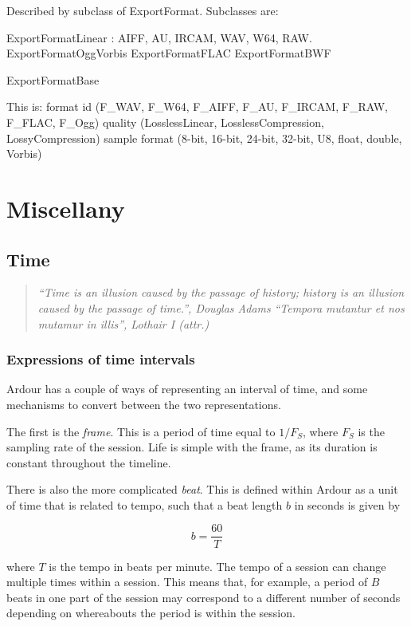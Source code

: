 \documentclass[10pt,a4paper]{book}
\begin{document}
Described by subclass of ExportFormat.  Subclasses are:

ExportFormatLinear : AIFF, AU, IRCAM, WAV, W64, RAW.
ExportFormatOggVorbis
ExportFormatFLAC
ExportFormatBWF

ExportFormatBase 

This is:
 format id (F\_WAV, F\_W64, F\_AIFF, F\_AU, F\_IRCAM, F\_RAW, F\_FLAC, F\_Ogg)
 quality (LosslessLinear, LosslessCompression, LossyCompression)
 sample format (8-bit, 16-bit, 24-bit, 32-bit, U8, float, double, Vorbis)


\chapter{Miscellany}

\section{Time}

\begin{quote}
\emph{``Time is an illusion caused by the passage of history; history is an illusion caused by the passage of time.'', Douglas Adams}
\medskip
\emph{``Tempora mutantur et nos mutamur in illis'', Lothair I (attr.)}
\end{quote}

\subsection{Expressions of time intervals}

Ardour has a couple of ways of representing an interval of time, and
some mechanisms to convert between the two representations.

The first is the \emph{frame}.  This is a period of time equal to
$1/F_S$, where $F_S$ is the sampling rate of the session.  Life is
simple with the frame, as its duration is constant throughout the
timeline. 

There is also the more complicated \emph{beat}.  This is defined
within Ardour as a unit of time that is related to tempo, such that a
beat length $b$ in seconds is given by

\begin{equation}
b = \frac{60}{T}
\end{equation}

where $T$ is the tempo in beats per minute.  The tempo of a session
can change multiple times within a session.  This means that, for
example, a period of $B$ beats in one part of the session may
correspond to a different number of seconds depending on whereabouts
the period is within the session.
\end{document}
